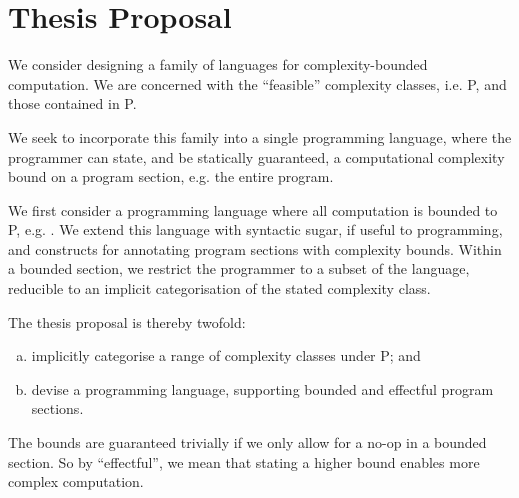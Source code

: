 
\section{Thesis Proposal}

We consider designing a family of languages for complexity-bounded computation.
We are concerned with the ``feasible'' complexity classes, i.e. P, and those
contained in P.

We seek to incorporate this family into a single programming language, where
the programmer can state, and be statically guaranteed, a computational
complexity bound on a program section, e.g. the entire program.

We first consider a programming language where all computation is bounded to P,
e.g. \cite{bellantoni-cook-1992,jones-1999}. We extend this language with
syntactic sugar, if useful to programming, and constructs for annotating
program sections with complexity bounds. Within a bounded section, we restrict
the programmer to a subset of the language, reducible to an implicit
categorisation of the stated complexity class.

The thesis proposal is thereby twofold:

\begin{enumerate}[(a)]

\item implicitly categorise a range of complexity classes under P; and

\item devise a programming language, supporting bounded and effectful program
sections.

\end{enumerate}

The bounds are guaranteed trivially if we only allow for a no-op in a bounded
section. So by ``effectful'', we mean that stating a higher bound enables more
complex computation.
